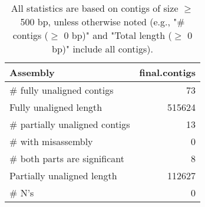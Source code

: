 \documentclass[12pt,a4paper]{article}
\begin{document}
\begin{table}[ht]
\begin{center}
\caption{All statistics are based on contigs of size $\geq$ 500 bp, unless otherwise noted (e.g., "\# contigs ($\geq$ 0 bp)" and "Total length ($\geq$ 0 bp)" include all contigs).}
\begin{tabular}{|l*{1}{|r}|}
\hline
Assembly & final.contigs \\ \hline
\# fully unaligned contigs & 73 \\ \hline
Fully unaligned length & 515624 \\ \hline
\# partially unaligned contigs & 13 \\ \hline
\hspace{5mm}\# with misassembly & 0 \\ \hline
\hspace{5mm}\# both parts are significant & 8 \\ \hline
Partially unaligned length & 112627 \\ \hline
\# N's & 0 \\ \hline
\end{tabular}
\end{center}
\end{table}
\end{document}
